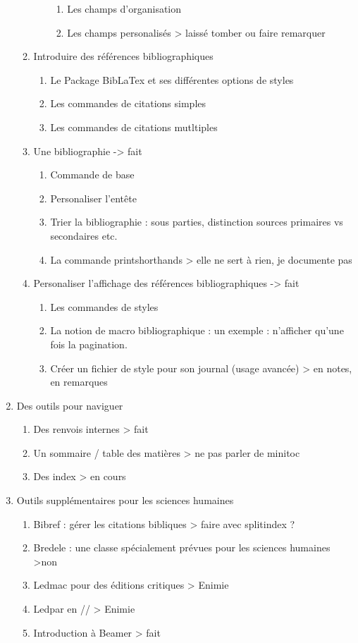 \begin{enumerate}
\begin{enumerate}
\begin{enumerate}
\begin{enumerate}
			\item Les champs d'organisation
			\item Les champs personalisés				> laissé tomber ou faire remarquer
		\end{enumerate} 
	\end{enumerate}
\item{Introduire des références bibliographiques}
	\begin{enumerate}
	\item Le Package BibLaTex et ses différentes options de styles
	\item Les commandes de citations simples
	\item Les commandes de citations mutltiples
	\end{enumerate}
\item Une bibliographie							-> fait
	\begin{enumerate}
	\item Commande de base
	\item Personaliser l'entête
	\item Trier la bibliographie : sous parties, distinction sources primaires vs secondaires etc.
	\item La commande printshorthands				> elle ne sert à rien, je documente pas
	\end{enumerate}

\item Personaliser l'affichage des références bibliographiques	-> fait
	\begin{enumerate}
	\item Les commandes de styles
	\item La notion de macro bibliographique : un exemple : n'afficher qu'une fois la pagination.
	\item Créer un fichier de style pour son journal (usage avancée)	> en notes, en remarques
	\end{enumerate}	
\end{enumerate}

\item Des outils pour naviguer
\begin{enumerate}
\item Des renvois internes					> fait
\item Un sommaire / table des matières			> ne pas parler de minitoc
\item Des index							> en cours
\end{enumerate}

\item Outils supplémentaires pour les sciences humaines
\begin{enumerate}
\item Bibref : gérer les citations bibliques			> faire avec splitindex ?
\item Bredele : une classe spécialement prévues pour les sciences humaines >non
\item Ledmac pour des éditions critiques			> Enimie	
\item Ledpar en //							> Enimie
\item Introduction à Beamer					> fait
\end{enumerate}


\end{enumerate}
